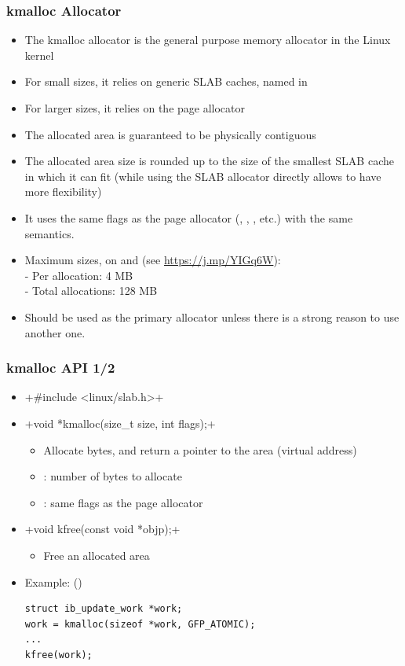\begin{frame}
  \frametitle{kmalloc Allocator}
  \begin{itemize}
  \item The kmalloc allocator is the general purpose memory allocator
    in the Linux kernel
  \item For small sizes, it relies on generic SLAB caches, named
     in 
  \item For larger sizes, it relies on the page allocator
  \item The allocated area is guaranteed to be physically contiguous
  \item The allocated area size is rounded up to the size of the
        smallest SLAB cache in which it can fit
        (while using the SLAB allocator directly allows to have more
        flexibility)
  \item It uses the same flags as the page allocator (,
    , , etc.) with the same semantics.
  \item Maximum sizes, on  and  (see
    \url{https://j.mp/YIGq6W}): \\
    - Per allocation: 4 MB \\
    - Total allocations: 128 MB
  \item Should be used as the primary allocator unless there is a
    strong reason to use another one.
  \end{itemize}
\end{frame}

\begin{frame}[fragile]
  \frametitle{kmalloc API 1/2}
  \begin{itemize}
  \item {}+#include <linux/slab.h>+
  \item {}+void *kmalloc(size_t size, int flags);+
    \begin{itemize}
    \item Allocate  bytes, and return a pointer to the area
      (virtual address)
    \item {}: number of bytes to allocate
    \item {}: same flags as the page allocator
    \end{itemize}
  \item {}+void kfree(const void *objp);+
    \begin{itemize}
    \item Free an allocated area
    \end{itemize}
  \item Example: ()
\begin{verbatim}
struct ib_update_work *work;
work = kmalloc(sizeof *work, GFP_ATOMIC);
...
kfree(work);
\end{verbatim}
  \end{itemize}
\end{frame}

